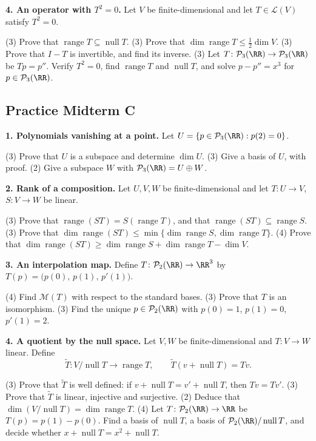 \documentclass[11pt]{scrartcl}
\DeclareMathOperator{\nul}{null}
\DeclareMathOperator{\range}{range}
\newcommand{\LL}{\mathcal L}
\newcommand{\PP}{\mathcal P}
\newcommand{\MM}{\mathcal M}
\begin{document}
\medskip\noindent\textbf{4. An operator with $T^2=0$.} Let $V$ be finite-dimensional and let $T\in\LL(V)$ satisfy $T^2=0$.
\begin{enumerate}[a)]
  \ii (3) Prove that $\range T\subseteq\nul T$.
  \ii (3) Prove that $\dim\range T\le\frac12\dim V$.
  \ii (3) Prove that $I-T$ is invertible, and find its inverse.
  \ii (3) Let $T\colon\PP_3(\RR)\to\PP_3(\RR)$ be $Tp=p''$. Verify $T^2=0$, find $\range T$ and $\nul T$, and solve $p-p''=x^3$ for $p\in\PP_3(\RR)$.
\end{enumerate}

\endgroup
\clearpage\begingroup\subsection{Practice Midterm C}

\medskip\noindent\textbf{1. Polynomials vanishing at a point.} Let $U=\{p\in\PP_3(\RR):p(2)=0\}$.
\begin{enumerate}[a)]
  \ii (3) Prove that $U$ is a subspace and determine $\dim U$.
  \ii (3) Give a basis of $U$, with proof.
  \ii (2) Give a subspace $W$ with $\PP_3(\RR)=U\oplus W$.
\end{enumerate}

\medskip\noindent\textbf{2. Rank of a composition.} Let $U,V,W$ be finite-dimensional and let $T\colon U\to V$, $S\colon V\to W$ be linear.
\begin{enumerate}[a)]
  \ii (3) Prove that $\range(ST)=S(\range T)$, and that $\range(ST)\subseteq\range S$.
  \ii (3) Prove that $\dim\range(ST)\le\min\{\dim\range S,\dim\range T\}$.
  \ii (4) Prove that $\dim\range(ST)\ge\dim\range S+\dim\range T-\dim V$.
\end{enumerate}

\medskip\noindent\textbf{3. An interpolation map.} Define $T\colon\PP_2(\RR)\to\RR^3$ by $T(p)=\big(p(0),\,p(1),\,p'(1)\big)$.
\begin{enumerate}[a)]
  \ii (4) Find $\MM(T)$ with respect to the standard bases.
  \ii (3) Prove that $T$ is an isomorphism.
  \ii (3) Find the unique $p\in\PP_2(\RR)$ with $p(0)=1$, $p(1)=0$, $p'(1)=2$.
\end{enumerate}

\medskip\noindent\textbf{4. A quotient by the null space.} Let $V,W$ be finite-dimensional and $T\colon V\to W$ linear. Define
\[ \tilde T\colon V/\nul T\longrightarrow\range T,\qquad \tilde T(v+\nul T)=Tv. \]
\begin{enumerate}[a)]
  \ii (3) Prove that $\tilde T$ is well defined: if $v+\nul T=v'+\nul T$, then $Tv=Tv'$.
  \ii (3) Prove that $\tilde T$ is linear, injective and surjective.
  \ii (2) Deduce that $\dim(V/\nul T)=\dim\range T$.
  \ii (4) Let $T\colon\PP_2(\RR)\to\RR$ be $T(p)=p(1)-p(0)$. Find a basis of $\nul T$, a basis of $\PP_2(\RR)/\nul T$, and decide whether $x+\nul T=x^2+\nul T$.
\end{enumerate}
\end{document}
